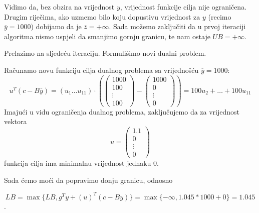 \documentclass[a4paper, utf8, 11pt, colorlinks]{book}
\begin{document}
Vidimo da, bez obzira na vrijednost $y$, vrijednost funkcije cilja nije ograničena.
Drugim riječima, ako uzmemo bilo koju dopustivu vrijednost za $y$ (recimo $\overline{y}=1000$) dobijamo da je $\overline{z} = +\infty$. Sada možemo zaključiti da u prvoj iteraciji algoritma nismo uspjeli da smanjimo gornju granicu, te nam ostaje $UB = +\infty$.

 Prelazimo na sljedeću iteraciju. Formulišimo novi dualni problem.
 
  Računamo novu funkciju cilja dualnog problema sa vrijednošću $\overline{y}=1000$:
 $$
 u^T (c-B\overline{y})=(u_1\ldots u_{11})\cdot \left(\left(\begin{array}{c}
 	1000 \\
 	100 \\
 	\vdots \\
 	100
 \end{array}\right)-\left(\begin{array}{c}
 	1000 \\
 	0 \\
 	\vdots \\
 	0
 \end{array}\right)\right) = 100u_2+\ldots+100u_{11}
 $$
 Imajući u vidu ograničenja dualnog problema, zaključujemo da za vrijednost vektora $$u=\left(\begin{array}{c}
 	1.1 \\
 	0 \\
 	\vdots \\
 	0
 \end{array}\right)$$
funkcija cilja ima minimalnu vrijednost jednaku 0.

Sada ćemo moći da popravimo donju granicu, odnosno

$$LB = \max\{LB,g^Ty+(u)^T(c-By)\}=\max\{-\infty,1.045*1000+0\} = 1.045$$.
\end{document}
